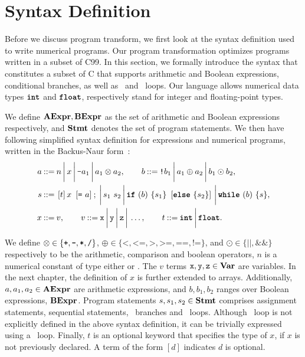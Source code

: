 \section{Syntax Definition}
\label{po:sec:syntax_definition}

Before we discuss program transform, we first look at the syntax definition
used to write numerical programs.  Our program transformation optimizes
programs written in a subset of C99.  In this section, we formally introduce
the syntax that constitutes a subset of C that supports arithmetic and Boolean
expressions, conditional branches, as well as \whilelit~and \forlit~loops.  Our
language allows numerical data types $\texttt{\textbf{int}}$ and $\texttt{\textbf{float}}$, respectively
stand for integer and floating-point types.

We define $\mathbf{AExpr}, \mathbf{BExpr}$ as the set of arithmetic and Boolean
expressions respectively, and $\mathbf{Stmt}$ denotes the set of program statements.
We then have following simplified syntax definition for expressions and
numerical programs, written in the Backus-Naur form~\cite{knuth64}:
\begin{equation}
    \begin{aligned}
        a \mathbin{::=} {} &
            n \,\bigg|\,
            x \,\bigg|\,
            \texttt{-}a_1 \,\bigg|\,
            a_1 \otimes a_2, \qquad
        b \mathbin{::=}
            \texttt{!}b_1 \,\bigg|\,
            a_1 \oplus a_2 \,\bigg|\,
            b_1 \odot b_2, \\
        s \mathbin{::=} {} &
            \left[ t \right] x~\left[ \texttt{=}~a \right] \mathbin{;} \,\bigg|\,
            s_1~s_2 \,\bigg|\,
            \texttt{\textbf{if}}~(b)~\{ s_1 \}~\left[\texttt{\textbf{else}}~\{ s_2 \}\right] \,\bigg|\,
            \texttt{\textbf{while}}~(b)~\{s\}, \\
        x \mathbin{::=} {} & v, \qquad
        v \mathbin{::=} \texttt{x} \,\bigg|\, \texttt{y} \,\bigg|\, \texttt{z} \,\bigg|\, \mathellipsis, \qquad
        t \mathbin{::=} \texttt{\textbf{int}} \,\bigg|\, \texttt{\textbf{float}}.
    \end{aligned}
    \label{po:eq:program_syntax}
\end{equation}

We define $\otimes \in \left\{ \texttt{+}, \texttt{-}, \texttt{*}, \texttt{/}
\right\}$, $\oplus \in \{ \texttt{<}, \texttt{<=}, \texttt{>}, \texttt{>=},
\texttt{==}, \texttt{!=} \}$, and $\odot \in \{ \texttt{||}, \texttt{\&\&}
\}$ respectively to be the arithmetic, comparison and boolean operators,
$n$ is a numerical constant of type either \inttype{} or \floattype.  The
$v$ terms $\texttt{x}, \texttt{y}, \texttt{z} \in \mathbf{Var}$ are variables.  In the next
chapter, the definition of $x$ is further extended to arrays.  Additionally,
$a, a_1, a_2 \in \mathbf{AExpr}$ are arithmetic expressions, and $b, b_1, b_2$
ranges over Boolean expressions, $\mathbf{BExpr}$.  Program statements $s, s_1,
s_2 \in \mathbf{Stmt}$ comprises assignment statements, sequential statements,
\iflit~branches and \whilelit~loops.  Although \forlit~loop is not explicitly
defined in the above syntax definition, it can be trivially expressed using a
\whilelit~loop.  Finally, $t$ is an optional keyword that specifies the type of
$x$, if $x$ is not previously declared.  A term of the form $[d]$ indicates $d$
is optional.

